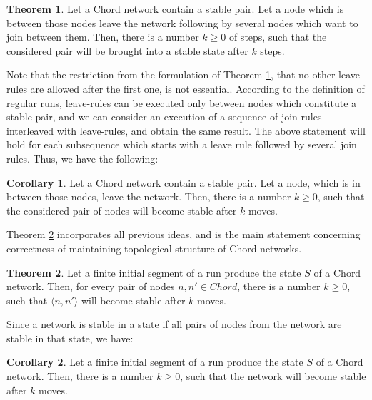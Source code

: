 \documentclass{amsart}
\theoremstyle{definition}
\newtheorem{theorem}{Theorem}[section]
\newtheorem{corollary}{Corollary}[section]
\begin{document}
\begin{theorem}\label{stab_mix_join_leave}
Let a Chord network contain a stable pair. Let a node which is
between those nodes leave the network following by several nodes
which want to join between them.
Then, there is a number $k \geqslant 0$ of steps, such that
the considered pair will be brought into a stable state after $k$
steps.
\end{theorem}

Note that the restriction from the formulation of Theorem \ref{stab_mix_join_leave}, that no other leave-rules are allowed after the
first one, is not essential. According to the definition of regular runs, leave-rules can be executed only between nodes which constitute a stable pair, and we
can consider an execution of a sequence of join rules interleaved with leave-rules, and obtain the same result. The above statement
will hold for each subsequence which starts with a leave rule followed by several join rules. Thus, we have the following:




\begin{corollary} \label{cor3}
Let a Chord network contain a stable pair. Let a node, which is in between those nodes, leave the network.
Then, there is a number $k \geqslant 0$, such that
the considered pair of nodes will become stable after $k$
moves.
\end{corollary}




Theorem \ref{chord_cycle} incorporates all previous ideas, and is the main statement concerning correctness of maintaining topological
structure of Chord networks.


\begin{theorem}\label{chord_cycle}
Let a finite initial segment of a run produce the state $S$ of a
Chord network. Then, for every pair of nodes $n, n' \in Chord$,
there is a number $k \geqslant 0$, such that
$\langle n, n' \rangle$ will become stable after $k$ moves.
\end{theorem}

Since a network is stable in a state if all pairs of nodes from
the network are stable in that state, we have:


\begin{corollary} \label{cor4}
Let a finite initial segment of a run produce the state $S$ of a
Chord network. Then, there is a number $k \geqslant 0$, such that
the network will become stable after $k$ moves.
\end{corollary}
\end{document}
